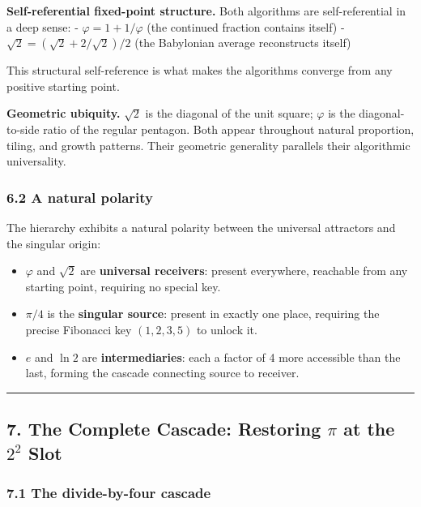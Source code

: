 \documentclass[
  11pt,
  letterpaper,
]{article}
\providecommand{\tightlist}{%
  \setlength{\itemsep}{0pt}\setlength{\parskip}{0pt}}
\begin{document}
\textbf{Self-referential fixed-point structure.} Both algorithms are
self-referential in a deep sense: - \(\varphi = 1 + 1/\varphi\) (the
continued fraction contains itself) -
\(\sqrt{2} = (\sqrt{2} + 2/\sqrt{2})/2\) (the Babylonian average
reconstructs itself)

This structural self-reference is what makes the algorithms converge
from any positive starting point.

\textbf{Geometric ubiquity.} \(\sqrt{2}\) is the diagonal of the unit
square; \(\varphi\) is the diagonal-to-side ratio of the regular
pentagon. Both appear throughout natural proportion, tiling, and growth
patterns. Their geometric generality parallels their algorithmic
universality.

\subsubsection{6.2 A natural polarity}\label{a-natural-polarity}

The hierarchy exhibits a natural polarity between the universal
attractors and the singular origin:

\begin{itemize}
\tightlist
\item
  \(\varphi\) and \(\sqrt{2}\) are \textbf{universal receivers}: present
  everywhere, reachable from any starting point, requiring no special
  key.
\item
  \(\pi/4\) is the \textbf{singular source}: present in exactly one
  place, requiring the precise Fibonacci key \((1, 2, 3, 5)\) to unlock
  it.
\item
  \(e\) and \(\ln 2\) are \textbf{intermediaries}: each a factor of 4
  more accessible than the last, forming the cascade connecting source
  to receiver.
\end{itemize}

\begin{center}\rule{0.5\linewidth}{0.5pt}\end{center}

\subsection{\texorpdfstring{7. The Complete Cascade: Restoring \(\pi\)
at the \(2^2\)
Slot}{7. The Complete Cascade: Restoring \textbackslash pi at the 2\^{}2 Slot}}\label{the-complete-cascade-restoring-pi-at-the-22-slot}

\subsubsection{7.1 The divide-by-four
cascade}\label{the-divide-by-four-cascade}
\end{document}
